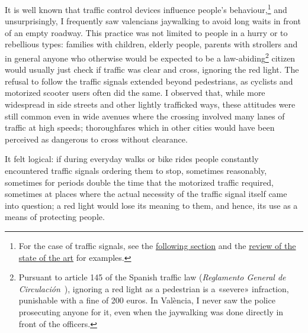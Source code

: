 \medskip


It is well known that traffic control devices influence people's
 behaviour,\footnote{
    For the case of traffic signals, see the \hyperref[sec:motivation]{following section} and the \hyperref[subsec:bckg_sota]{review of the state of the art} for examples.
 } and unsurprisingly, I frequently saw valencians jaywalking to avoid long
 waits in front of an empty roadway. This practice was not limited to people
 in a hurry or to rebellious types: families with children, elderly people,
 parents with strollers and in general anyone who otherwise would be expected
 to be a law-abiding\footnote{
    Pursuant to article 145 of the Spanish traffic law
     (\textit{Reglamento General de Circulación}~\cite{ReglamentoGeneraldeCirculacion}),
     ignoring a red light as a pedestrian is a «severe» infraction, punishable
     with a fine of 200 euros. In València, I never saw the police prosecuting
     anyone for it, even when the jaywalking was done directly in front of the
     officers.}
 citizen would usually just check if traffic was clear and
 cross, ignoring the red light. The refusal to follow the traffic signals 
 extended beyond pedestrians, as cyclists and motorized scooter users often did
 the same. I observed that, while more widespread in side streets and other lightly trafficked ways, these attitudes were still common even in wide avenues where the crossing involved many lanes of traffic at high speeds; thoroughfares which in other cities would have been perceived as
 dangerous to cross without clearance.
 
It felt logical: if during everyday walks or bike rides people constantly
 encountered traffic signals ordering them to stop, sometimes reasonably, 
 sometimes for periods double the time that the motorized traffic required,
 sometimes at places where the actual necessity of the traffic signal itself
 came into question; a red light would lose its meaning to them, and hence,
 its use as a means of protecting people.

